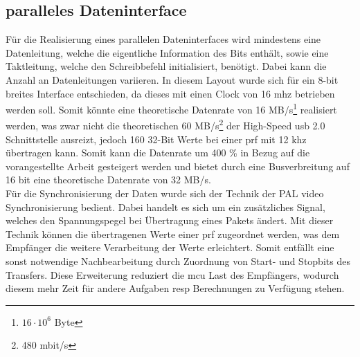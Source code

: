\subsection{paralleles Dateninterface}\label{subsec:interface_parallel}
Für die Realisierung eines parallelen Dateninterfaces wird mindestens eine Datenleitung, welche die eigentliche Information des Bits enthält, sowie eine Taktleitung, welche den Schreibbefehl initialisiert, benötigt. Dabei kann die Anzahl an Datenleitungen variieren. In diesem Layout wurde sich für ein 8-bit breites Interface entschieden, da dieses mit einen Clock von 16 \ac{mhz} betrieben werden soll. Somit könnte eine theoretische Datenrate von 16 MB/s\footnote{$16\cdot 10^6$ Byte} realisiert werden, was zwar nicht die theoretischen 60 MB/s\footnote{480 mbit/s} der High-Speed \ac{usb} 2.0 Schnittstelle ausreizt, jedoch 160 32-Bit Werte bei einer \ac{prf} mit 12 \ac{khz} übertragen kann. Somit kann die Datenrate um 400 \% in Bezug auf die vorangestellte Arbeit gesteigert werden und bietet durch eine Busverbreitung auf 16 bit eine theoretische Datenrate von 32 MB/s.\\
Für die Synchronisierung der Daten wurde sich der Technik der PAL video Synchronisierung bedient. Dabei handelt es sich um ein zusätzliches Signal, welches den Spannungspegel bei Übertragung eines Pakets ändert. Mit dieser Technik können die übertragenen Werte einer \ac{prf} zugeordnet werden, was dem Empfänger die weitere Verarbeitung der Werte erleichtert. Somit entfällt eine sonst notwendige Nachbearbeitung durch Zuordnung von Start- und Stopbits des Transfers. Diese Erweiterung reduziert die \ac{mcu} Last des Empfängers, wodurch diesem mehr Zeit für andere Aufgaben \ac{resp} Berechnungen zu Verfügung stehen.
%
%
%

\setlength{\unitlength}{1cm}
\newcommand*{\clki}{
  \draw (t_cur) -- ++(0,.3) -- ++(.5,0) -- ++(0,-.6) -- ++(.5,0) -- ++(0,.3)
    node[time] (t_cur) {};
}

\newcommand*{\bitvector}[3]{
  \draw[fill=#3] (t_cur) -- ++( .1, .3) -- ++(#2-.2,0) -- ++(.1, -.3)
                         -- ++(-.1,-.3) -- ++(.2-#2,0) -- cycle;
  \path (t_cur) -- node[anchor=mid] {#1} ++(#2,0) node[time] (t_cur) {};
}

\newcommand*{\known}[2]{
    \bitvector{#1}{#2}{white}
}

\newcommand*{\unknown}[2][XXX]{
    \bitvector{#1}{#2}{black!20}
}

